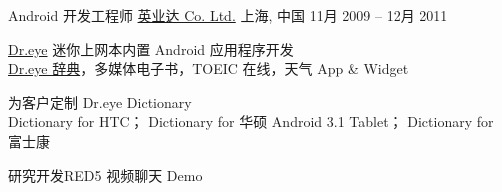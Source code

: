 \begin{cventries}
	\cventry
	{Android 开发工程师}
	{\href{http://www.inventec.com/english/indexEN.htm}{英业达 Co. Ltd.}}
	{上海, \enskip 中国}
	{11月 2009 – 12月 2011}
	{
		\begin{cvitems}
			\item {\href{http://www.androidcentral.com/android-powered-dr-eye-makes-its-debut}{Dr.eye} 迷你上网本内置 Android 应用程序开发\\
			\href{https://play.google.com/store/apps/details?id=com.inventec.dreye.dictnew}{Dr.eye 辞典}，多媒体电子书，TOEIC 在线，天气 App \& Widget}
			\item {为客户定制 Dr.eye Dictionary\\
			Dictionary for HTC；
			Dictionary for 华硕 Android 3.1 Tablet；
			Dictionary for 富士康}
			\item {研究开发RED5 视频聊天 Demo}
			\\
			\\
			\\
			\\
			\\
			\\
		\end{cvitems}
	}
\end{cventries}

